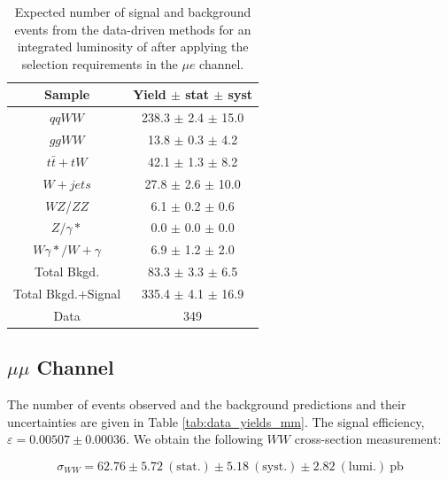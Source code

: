 \begin{table}[ht!]
  \begin{center}
  \begin{tabular} {|c|c|}
\hline
Sample                & Yield $\pm$ stat $\pm$ syst \\ \hline \hline
$qqWW$                & 238.3 $\pm$  2.4 $\pm$ 15.0  \\ \hline
$ggWW$                & 13.8 $\pm$  0.3 $\pm$  4.2  \\ \hline
$t\bar{t} + tW$      & 42.1 $\pm$  1.3 $\pm$  8.2  \\ \hline
$W+jets$              & 27.8 $\pm$  2.6 $\pm$ 10.0  \\ \hline
$WZ$/$ZZ$             &  6.1 $\pm$  0.2 $\pm$  0.6  \\ \hline
$Z/\gamma*$          &  0.0 $\pm$  0.0 $\pm$  0.0  \\ \hline
$W\gamma*/W+\gamma$ &  6.9 $\pm$  1.2 $\pm$  2.0  \\ \hline \hline
Total Bkgd.           & 83.3 $\pm$  3.3 $\pm$  6.5  \\ \hline \hline
Total Bkgd.+Signal    & 335.4 $\pm$  4.1 $\pm$ 16.9  \\ \hline \hline
Data                  & 349 \\ \hline
\end{tabular}
  \caption{Expected number of signal and background events from the data-driven methods for
  an integrated luminosity of \intlumi after applying the selection requirements in the $\mu e$ channel.}
   \label{tab:data_yields_me}
  \end{center}
\end{table}

%
%
%
\subsection{$\mu\mu$ Channel}

The number of events observed and the background predictions and their uncertainties are
given in Table \ref{tab:data_yields_mm}.
The signal efficiency,  $\varepsilon = 0.00507 \pm 0.00036$.
We obtain the following $WW$ cross-section measurement:

\begin{equation*}
\sigma_{WW}  = 62.76 \pm 5.72~\mathrm{(stat.)} \pm 5.18~\mathrm{(syst.)} \pm 2.82~\mathrm{(lumi.)~pb} 
\end{equation*}

